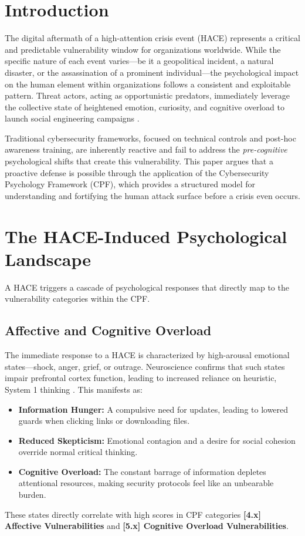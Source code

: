 \documentclass[11pt,a4paper]{article}
\begin{document}
\section{Introduction}
The digital aftermath of a high-attention crisis event (HACE) represents a critical and predictable vulnerability window for organizations worldwide. While the specific nature of each event varies—be it a geopolitical incident, a natural disaster, or the assassination of a prominent individual—the psychological impact on the human element within organizations follows a consistent and exploitable pattern. Threat actors, acting as opportunistic predators, immediately leverage the collective state of heightened emotion, curiosity, and cognitive overload to launch social engineering campaigns \cite{verizon2023}.

Traditional cybersecurity frameworks, focused on technical controls and post-hoc awareness training, are inherently reactive and fail to address the \textit{pre-cognitive} psychological shifts that create this vulnerability. This paper argues that a proactive defense is possible through the application of the Cybersecurity Psychology Framework (CPF), which provides a structured model for understanding and fortifying the human attack surface before a crisis even occurs.

\section{The HACE-Induced Psychological Landscape}
A HACE triggers a cascade of psychological responses that directly map to the vulnerability categories within the CPF.

\subsection{Affective and Cognitive Overload}
The immediate response to a HACE is characterized by high-arousal emotional states—shock, anger, grief, or outrage. Neuroscience confirms that such states impair prefrontal cortex function, leading to increased reliance on heuristic, System 1 thinking \cite{ledoux2000, kahneman2011}. This manifests as:
\begin{itemize}
\item \textbf{Information Hunger:} A compulsive need for updates, leading to lowered guards when clicking links or downloading files.
\item \textbf{Reduced Skepticism:} Emotional contagion and a desire for social cohesion override normal critical thinking.
\item \textbf{Cognitive Overload:} The constant barrage of information depletes attentional resources, making security protocols feel like an unbearable burden.
\end{itemize}
These states directly correlate with high scores in CPF categories \textbf{[4.x] Affective Vulnerabilities} and \textbf{[5.x] Cognitive Overload Vulnerabilities}.
\end{document}
